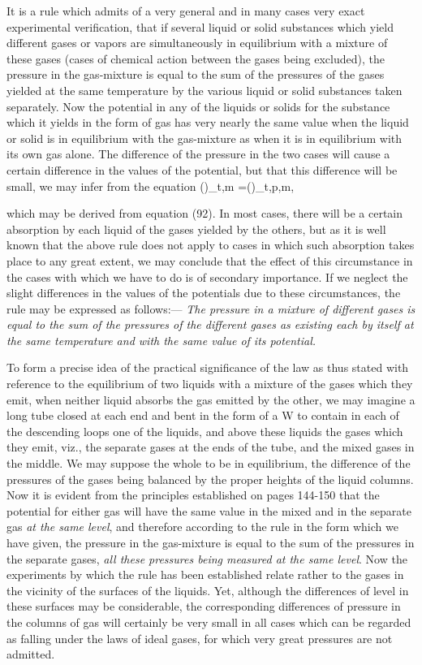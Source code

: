 \documentclass[12pt]{memoir}
\begin{document}
It is a rule which admits of a very general and in many cases very exact experimental verification, that if several liquid or solid substances which yield different gases or vapors are simultaneously in equilibrium with a mixture of these gases (cases of chemical action between the gases being excluded), the pressure in the gas-mixture is equal to the sum of the pressures of the gases yielded at the same temperature by the various liquid or solid substances taken separately. Now the potential in any of the liquids or solids for the substance which it yields in the form of gas has very nearly the same value when the liquid or solid is in equilibrium with the gas-mixture as when it is in equilibrium with its own gas alone. The difference of the pressure in the two cases will cause a certain difference in the values of the potential, but that this difference will be small, we may infer from the equation
\eqs
\left(\right)_{t,m} =\left(\right)_{t,p,m},       \label{272}\eqe

which may be derived from equation (92). In most cases, there will be a certain absorption by each liquid of the gases yielded by the others, but as it is well known that the above rule does not apply to cases in which such absorption takes place to any great extent, we may conclude that the effect of this circumstance in the cases with which we have to do is of secondary importance. If we neglect the slight differences in the values of the potentials due to these circumstances, the rule may be expressed as follows:---
\textit{The pressure in a mixture of different gases is equal to the sum of the pressures of the different gases as existing each by itself at the same temperature and with the same value of its potential.}


To form a precise idea of the practical significance of the law as thus stated with reference to the equilibrium of two liquids with a mixture of the gases which they emit, when neither liquid absorbs the gas emitted by the other, we may imagine a long tube closed at each end and bent in the form of a W to contain in each of the descending loops one of the liquids, and above these liquids the gases which they emit, viz., the separate gases at the ends of the tube, and the mixed gases in the middle. We may suppose the whole to be in equilibrium, the difference of the pressures of the gases being balanced by the proper heights of the liquid columns. Now it is evident from the principles established on pages 144-150 that the potential for either gas will have the same value in the mixed and in the separate gas \textit{at the same level}, and therefore according to the rule in the form which we have given, the pressure in the gas-mixture is equal to the sum of the pressures in the separate gases, \textit{all these pressures being measured at the same level}. Now the experiments by which the rule has been established relate rather to the gases in the vicinity of the surfaces of the liquids. Yet, although the differences of level in these surfaces may be considerable, the corresponding differences of pressure in the columns of gas will certainly be very small in all cases which can be regarded as falling under the laws of ideal gases, for which very great pressures are not admitted.
\end{document}
